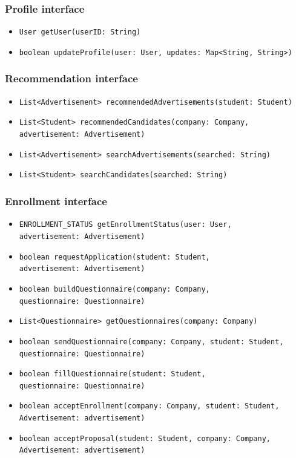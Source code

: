 \subsubsection{Profile interface}
\begin{itemize}
    \item \verb|User getUser(userID: String)|
    \item \verb|boolean updateProfile(user: User, updates: Map<String, String>)|
\end{itemize}

\subsubsection{Recommendation interface}
\begin{itemize}
    \item \verb|List<Advertisement> recommendedAdvertisements(student: Student)|
    \item \verb|List<Student> recommendedCandidates(company: Company, | \\ \makebox[10em][l]{} \verb|advertisement: Advertisement)|
    \item \verb|List<Advertisement> searchAdvertisements(searched: String)|
    \item \verb|List<Student> searchCandidates(searched: String)|
\end{itemize}

\subsubsection{Enrollment interface}
\begin{itemize}
    \item \verb|ENROLLMENT_STATUS getEnrollmentStatus(user: User, | \\ \makebox[10em][l]{} \verb|advertisement: Advertisement)|
    \item \verb|boolean requestApplication(student: Student, | \\ \makebox[10em][l]{} \verb|advertisement: Advertisement)|
    \item \verb|boolean buildQuestionnaire(company: Company, | \\ \makebox[10em][l]{} \verb|questionnaire: Questionnaire)|
    \item \verb|List<Questionnaire> getQuestionnaires(company: Company)|
    \item \verb|boolean sendQuestionnaire(company: Company, student: Student, | \\ \makebox[10em][l]{} \verb|questionnaire: Questionnaire)|
    \item \verb|boolean fillQuestionnaire(student: Student, | \\ \makebox[10em][l]{} \verb|questionnaire: Questionnaire)|
    \item \verb|boolean acceptEnrollment(company: Company, student: Student, | \\ \makebox[10em][l]{} \verb|Advertisement: advertisement)|
    \item \verb|boolean acceptProposal(student: Student, company: Company, | \\ \makebox[10em][l]{} \verb|Advertisement: advertisement)|
\end{itemize}

